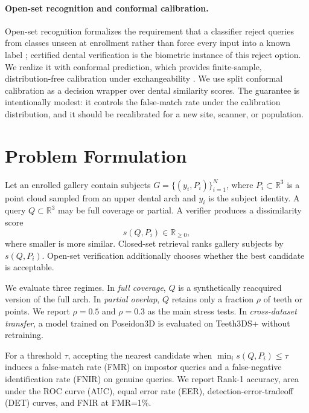 \documentclass[10pt,twocolumn]{article}
\newcommand{\R}{\mathbb{R}}
\newcommand{\score}{s}
\begin{document}
\paragraph{Open-set recognition and conformal calibration.}
Open-set recognition formalizes the requirement that a classifier reject queries from classes unseen at enrollment rather than force every input into a known label \citep{scheirer2013openset}; certified dental verification is the biometric instance of this reject option. We realize it with conformal prediction, which provides finite-sample, distribution-free calibration under exchangeability \citep{vovk2005algorithmic,angelopoulos2021gentle}. We use split conformal calibration as a decision wrapper over dental similarity scores. The guarantee is intentionally modest: it controls the false-match rate under the calibration distribution, and it should be recalibrated for a new site, scanner, or population.

\section{Problem Formulation}
Let an enrolled gallery contain subjects $G=\{(y_i,P_i)\}_{i=1}^{N}$, where $P_i\subset\R^3$ is a point cloud sampled from an upper dental arch and $y_i$ is the subject identity. A query $Q\subset\R^3$ may be full coverage or partial. A verifier produces a dissimilarity score
\begin{equation}
  \score(Q,P_i) \in \R_{\ge 0},
\end{equation}
where smaller is more similar. Closed-set retrieval ranks gallery subjects by $\score(Q,P_i)$. Open-set verification additionally chooses whether the best candidate is acceptable.

We evaluate three regimes. In \emph{full coverage}, $Q$ is a synthetically reacquired version of the full arch. In \emph{partial overlap}, $Q$ retains only a fraction $\rho$ of teeth or points. We report $\rho=0.5$ and $\rho=0.3$ as the main stress tests. In \emph{cross-dataset transfer}, a model trained on Poseidon3D is evaluated on Teeth3DS+ without retraining.

For a threshold $\tau$, accepting the nearest candidate when $\min_i \score(Q,P_i)\le \tau$ induces a false-match rate (FMR) on impostor queries and a false-negative identification rate (FNIR) on genuine queries. We report Rank-1 accuracy, area under the ROC curve (AUC), equal error rate (EER), detection-error-tradeoff (DET) curves, and FNIR at FMR=1\%.
\end{document}
